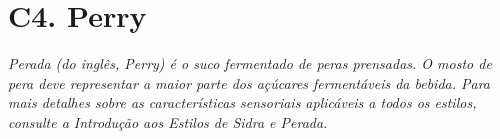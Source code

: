\section*{C4. Perry}
\textit{Perada (do inglês, Perry) é o suco fermentado de peras prensadas. O mosto de pera deve representar a maior parte dos açúcares fermentáveis da bebida. Para mais detalhes sobre as características sensoriais aplicáveis a todos os estilos, consulte a Introdução aos Estilos de Sidra e Perada.}
